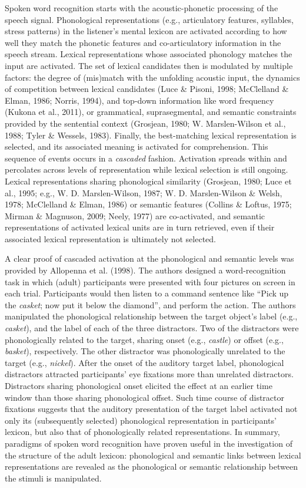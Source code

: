 \documentclass[
  12pt,
  b5paperpaper,
  twoside]{scrreprt}
\begin{document}
Spoken word recognition starts with the acoustic-phonetic processing of
the speech signal. Phonological representations (e.g., articulatory
features, syllables, stress patterns) in the listener's mental lexicon
are activated according to how well they match the phonetic features and
co-articulatory information in the speech stream. Lexical
representations whose associated phonology matches the input are
activated. The set of lexical candidates then is modulated by multiple
factors: the degree of (mis)match with the unfolding acoustic input, the
dynamics of competition between lexical candidates (Luce \& Pisoni,
1998; McClelland \& Elman, 1986; Norris, 1994), and top-down information
like word frequency (Kukona et al., 2011), or grammatical,
suprasegmental, and semantic constraints provided by the sentential
context (Grosjean, 1980; W. Marslen-Wilson et al., 1988; Tyler \&
Wessels, 1983). Finally, the best-matching lexical representation is
selected, and its associated meaning is activated for comprehension.
This sequence of events occurs in a \emph{cascaded} fashion. Activation
spreads within and percolates across levels of representation while
lexical selection is still ongoing. Lexical representations sharing
phonological similarity (Grosjean, 1980; Luce et al., 1995; e.g., W. D.
Marslen-Wilson, 1987; W. D. Marslen-Wilson \& Welsh, 1978; McClelland \&
Elman, 1986) or semantic features (Collins \& Loftus, 1975; Mirman \&
Magnuson, 2009; Neely, 1977) are co-activated, and semantic
representations of activated lexical units are in turn retrieved, even
if their associated lexical representation is ultimately not selected.

A clear proof of cascaded activation at the phonological and semantic
levels was provided by Allopenna et al. (1998). The authors designed a
word-recognition task in which (adult) participants were presented with
four pictures on screen in each trial. Participants would then listen to
a command sentence like ``Pick up the \emph{casket}; now put it below
the diamond'', and perform the action. The authors manipulated the
phonological relationship between the target object's label (e.g.,
\emph{casket}), and the label of each of the three distractors. Two of
the distractors were phonologically related to the target, sharing onset
(e.g., \emph{castle}) or offset (e.g., \emph{basket}), respectively. The
other distractor was phonologically unrelated to the target (e.g.,
\emph{nickel}). After the onset of the auditory target label,
phonological distractors attracted participants' eye fixations more than
unrelated distractors. Distractors sharing phonological onset elicited
the effect at an earlier time window than those sharing phonological
offset. Such time course of distractor fixations suggests that the
auditory presentation of the target label activated not only its
(subsequently selected) phonological representation in participants'
lexicon, but also that of phonologically related representations. In
summary, paradigms of spoken word recognition have proven useful in the
investigation of the structure of the adult lexicon: phonological and
semantic links between lexical representations are revealed as the
phonological or semantic relationship between the stimuli is
manipulated.
\end{document}

